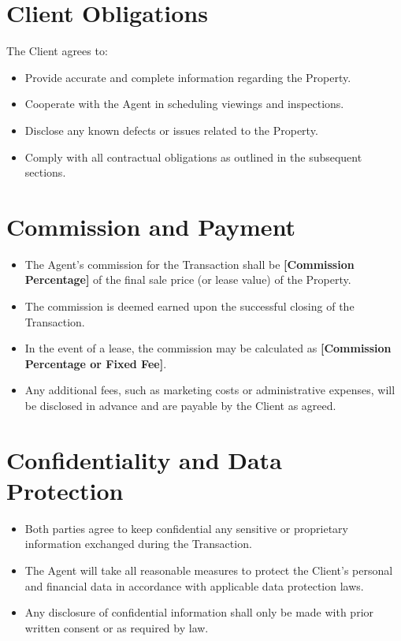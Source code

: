 \documentclass[12pt]{article}
\begin{document}
\section{Client Obligations}
The Client agrees to:
\begin{itemize}[leftmargin=1.5cm]
    \item Provide accurate and complete information regarding the Property.
    \item Cooperate with the Agent in scheduling viewings and inspections.
    \item Disclose any known defects or issues related to the Property.
    \item Comply with all contractual obligations as outlined in the subsequent sections.
\end{itemize}

\section{Commission and Payment} \label{sec:commission}
\begin{itemize}[leftmargin=1.5cm]
    \item The Agent's commission for the Transaction shall be \textbf{[Commission Percentage]} of the final sale price (or lease value) of the Property.
    \item The commission is deemed earned upon the successful closing of the Transaction.
    \item In the event of a lease, the commission may be calculated as \textbf{[Commission Percentage or Fixed Fee]}.
    \item Any additional fees, such as marketing costs or administrative expenses, will be disclosed in advance and are payable by the Client as agreed.
\end{itemize}

\section{Confidentiality and Data Protection}
\begin{itemize}[leftmargin=1.5cm]
    \item Both parties agree to keep confidential any sensitive or proprietary information exchanged during the Transaction.
    \item The Agent will take all reasonable measures to protect the Client's personal and financial data in accordance with applicable data protection laws.
    \item Any disclosure of confidential information shall only be made with prior written consent or as required by law.
\end{itemize}
\end{document}

